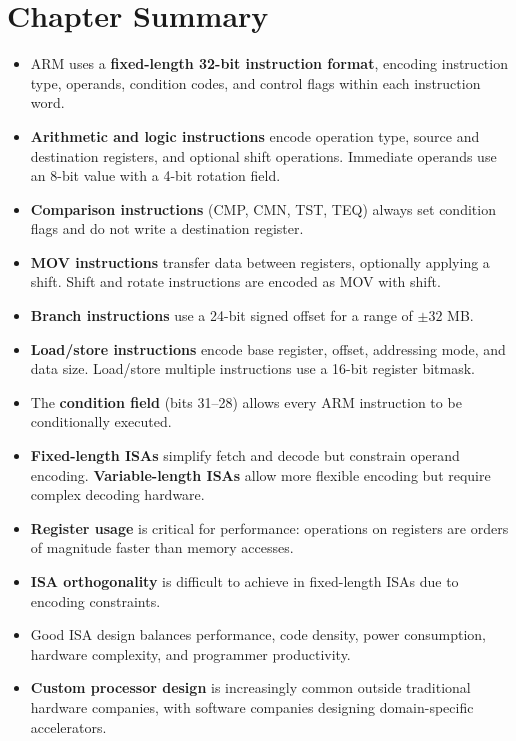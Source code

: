\documentclass[11pt, a4paper, notitlepage]{report}
\theoremstyle{definition}
\theoremstyle{remark}
\theoremstyle{definition}
\begin{document}
\section{Chapter Summary}

\begin{itemize}
  \item ARM uses a \textbf{fixed-length 32-bit instruction format}, encoding instruction type, operands, condition codes, and control flags within each instruction word.
  \item \textbf{Arithmetic and logic instructions} encode operation type, source and destination registers, and optional shift operations. Immediate operands use an 8-bit value with a 4-bit rotation field.
  \item \textbf{Comparison instructions} (CMP, CMN, TST, TEQ) always set condition flags and do not write a destination register.
  \item \textbf{MOV instructions} transfer data between registers, optionally applying a shift. Shift and rotate instructions are encoded as MOV with shift.
  \item \textbf{Branch instructions} use a 24-bit signed offset for a range of $\pm 32$ MB\@.
  \item \textbf{Load/store instructions} encode base register, offset, addressing mode, and data size. Load/store multiple instructions use a 16-bit register bitmask.
  \item The \textbf{condition field} (bits 31--28) allows every ARM instruction to be conditionally executed.
  \item \textbf{Fixed-length ISAs} simplify fetch and decode but constrain operand encoding. \textbf{Variable-length ISAs} allow more flexible encoding but require complex decoding hardware.
  \item \textbf{Register usage} is critical for performance: operations on registers are orders of magnitude faster than memory accesses.
  \item \textbf{ISA orthogonality} is difficult to achieve in fixed-length ISAs due to encoding constraints.
  \item Good ISA design balances performance, code density, power consumption, hardware complexity, and programmer productivity.
  \item \textbf{Custom processor design} is increasingly common outside traditional hardware companies, with software companies designing domain-specific accelerators.
\end{itemize}
\end{document}
